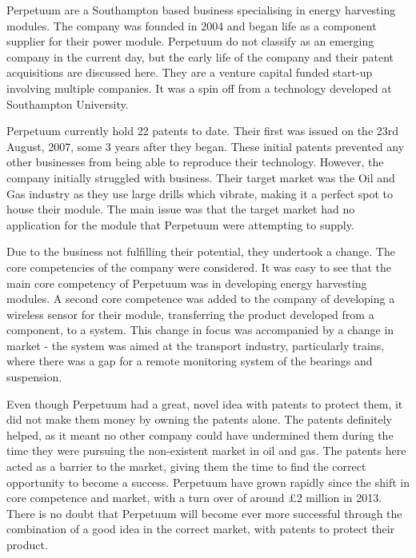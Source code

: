 {}


Perpetuum are a Southampton based business specialising in energy harvesting modules. 
The company was founded in 2004 and began life as a component supplier for their power module.
Perpetuum do not classify as an emerging company in the current day, but the early life of the company and their patent acquisitions are discussed here. 
They are a venture capital funded start-up involving multiple companies.
It was a spin off from a technology developed at Southampton University. 

Perpetuum currently hold 22 patents to date. 
Their first was issued on the 23rd August, 2007, some 3 years after they began.
These initial patents prevented any other businesses from being able to reproduce their technology. 
However, the company initially struggled with business.
Their target market was the Oil and Gas industry as they use large drills which vibrate, making it a perfect spot to house their module.
The main issue was that the target market had no application for the module that Perpetuum were attempting to supply. %

Due to the business not fulfilling their potential, they undertook a change. 
The core competencies of the company were considered.
It was easy to see that the main core competency of Perpetuum was in developing energy harvesting modules. 
A second core competence was added to the company of developing a wireless sensor for their module, transferring the product developed from a component, to a system.
This change in focus was accompanied by a change in market - the system was aimed at the transport industry, particularly trains, where there was a gap for a remote monitoring system of the bearings and suspension. 

Even though Perpetuum had a great, novel idea with patents to protect them, it did not make them money by owning the patents alone.
The patents definitely helped, as it meant no other company could have undermined them during the time they were pursuing the non-existent market in oil and gas.
The patents here acted as a barrier to the market, giving them the time to find the correct opportunity to become a success.
Perpetuum have grown rapidly since the shift in core competence and market, with a turn over of around \pounds 2 million in 2013.
There is no doubt that Perpetuum will become ever more successful through the combination of a good idea in the correct market, with patents to protect their product. 

